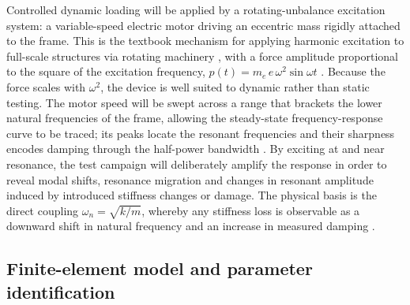 Controlled dynamic loading will be applied by a rotating-unbalance excitation system: a variable-speed electric motor driving an eccentric mass rigidly attached to the frame. This is the textbook mechanism for applying harmonic excitation to full-scale structures via rotating machinery \citep{cook2002fea}, with a force amplitude proportional to the square of the excitation frequency, $p(t)=m_e\,e\,\omega^2\sin\omega t$ \citep{chopra2017dynamics}. Because the force scales with $\omega^2$, the device is well suited to dynamic rather than static testing. The motor speed will be swept across a range that brackets the lower natural frequencies of the frame, allowing the steady-state frequency-response curve to be traced; its peaks locate the resonant frequencies and their sharpness encodes damping through the half-power bandwidth \citep{chopra2017dynamics}. By exciting at and near resonance, the test campaign will deliberately amplify the response in order to reveal modal shifts, resonance migration and changes in resonant amplitude induced by introduced stiffness changes or damage. The physical basis is the direct coupling $\omega_n=\sqrt{k/m}$, whereby any stiffness loss is observable as a downward shift in natural frequency and an increase in measured damping \citep{chopra2017dynamics}.

\subsection{Finite-element model and parameter identification}\label{subsec:femodel}

